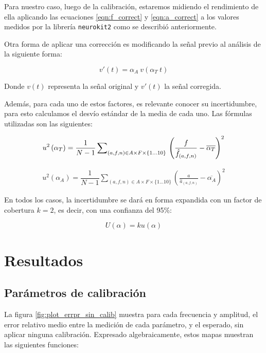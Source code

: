 \documentclass[conference]{IEEEtran}
\begin{document}
Para nuestro caso, luego de la calibración, estaremos midiendo el rendimiento
de ella aplicando las ecuaciones \ref{eqn:f_correct} y \ref{eqn:a_correct} a 
los valores medidos por la librería \texttt{neurokit2} como se describió
anteriormente.

Otra forma de aplicar una corrección es modificando la señal previo al análisis
de la siguiente forma:

$$ v'(t) = \alpha_{A} ~ v(\alpha_T ~ t)$$

Donde $v(t)$ representa la señal original y $v'(t)$ la señal corregida.

Además, para cada uno de estos factores, es relevante conocer su incertidumbre,
para esto calculamos el desvío estándar de la media de cada uno. Las fórmulas
utilizadas son las siguientes:

\begin{equation}
u^2 \left( \alpha_{T} \right) = \dfrac{1}{N - 1} \sum_{(a,f,n) \in A \times F
\times \{1...10 \}}\nolimits \\\left( \frac{f}{\hat{f}_{(a,f,n)}} - 
\overline{\alpha_{T}} \right)^2
\label{eqn:alpha_f_u}
\end{equation}


\begin{equation}
\begin{split}
u^2 \left( \alpha_{A} \right) = \dfrac{1}{N - 1} \sum_{(a,f,n) \in A \times F
\times \{1...10 \}}\nolimits \left( \frac{a}{\hat{a}_{(a,f,n)}} -
\overline{\alpha_{A}} \right)^2 
\label{eqn:alpha_a_u}
\end{split}
\end{equation}

En todos los casos, la incertidumbre se dará en forma expandida con un factor de
cobertura $k = 2$, es decir, con una confianza del 95\%:

$$U(\alpha) = k u(\alpha)$$

\section{Resultados}


\subsection{Parámetros de calibración}


La figura \ref{fig:plot_errpr_sin_calib} muestra para cada frecuencia y
amplitud, el error relativo medio entre la medición de cada parámetro, y el
esperado, sin aplicar ninguna calibración.
Expresado algebraicamente, estos mapas muestran las siguientes funciones:
\end{document}
